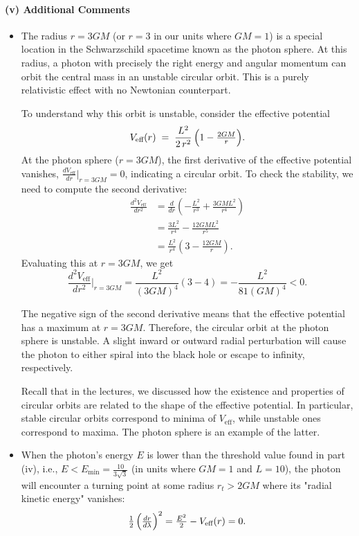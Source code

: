 \documentclass{article}
\begin{document}
\paragraph{(v) Additional Comments}

\begin{itemize}
    \item The radius \(r=3GM\) (or \(r=3\) in our units where \(GM=1\)) is a special location in the Schwarzschild spacetime known as the photon sphere. At this radius, a photon with precisely the right energy and angular momentum can orbit the central mass in an unstable circular orbit. This is a purely relativistic effect with no Newtonian counterpart.

    To understand why this orbit is unstable, consider the effective potential
    \[
    V_{\text{eff}}(r)
    \;=\;
    \frac{L^2}{2\,r^2}\,\Bigl(1-\tfrac{2GM}{r}\Bigr).
    \]
    At the photon sphere ($r=3GM$), the first derivative of the effective potential vanishes, $\frac{dV_{\text{eff}}}{dr}|_{r=3GM} = 0$, indicating a circular orbit.
    To check the stability, we need to compute the second derivative:
    \begin{align*}
        \frac{d^2V_{\text{eff}}}{dr^2} &= \frac{d}{dr}\left(-\frac{L^2}{r^3} + \frac{3GML^2}{r^4}\right) \\
        &= \frac{3L^2}{r^4} - \frac{12GML^2}{r^5} \\
        &= \frac{L^2}{r^4}\left(3 - \frac{12GM}{r}\right).
    \end{align*}
    Evaluating this at $r=3GM$, we get
    \[
        \frac{d^2V_{\text{eff}}}{dr^2}\Bigr|_{r=3GM} = \frac{L^2}{(3GM)^4}(3-4) = -\frac{L^2}{81(GM)^4} < 0.
    \]

    The negative sign of the second derivative means that the effective potential has a maximum at $r=3GM$. Therefore, the circular orbit at the photon sphere is unstable. A slight inward or outward radial perturbation will cause the photon to either spiral into the black hole or escape to infinity, respectively.

    Recall that in the lectures, we discussed how the existence and properties of circular orbits are related to the shape of the effective potential. In particular, stable circular orbits correspond to minima of $V_{\text{eff}}$, while unstable ones correspond to maxima. The photon sphere is an example of the latter.

    \item When the photon's energy \(E\) is lower than the threshold value found in part (iv), i.e., \(E < E_{\min} = \frac{10}{3\sqrt{3}}\) (in units where \(GM=1\) and \(L=10\)), the photon will encounter a turning point at some radius \(r_t > 2GM\) where its "radial kinetic energy" vanishes:
    \[
    \tfrac12\,\Bigl(\tfrac{dr}{d\lambda}\Bigr)^2 = \tfrac{E^2}{2} - V_{\text{eff}}(r) = 0.
    \]


\end{itemize}
\end{document}

